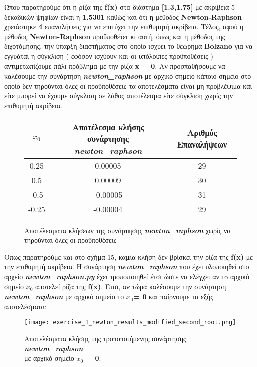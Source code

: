 \documentclass[First Project.tex]{subfiles}
\begin{document}
Ώπου παρατηρούμε ότι η ρίζα της \textlatin{\textbf{f(x)}} στο διάστημα \textlatin{\textbf{[1.3,1.75]}} με ακρίβεια 5 δεκαδικών ψηφίων 
είναι η \textbf{1.5301} καθώς και ότι η μέθοδος \textlatin{\textbf{Newton-Raphson}} χρειάστηκε \textbf{4} επαναλήψεις για να επιτύχει την 
επιθυμητή ακρίβεια. Τέλος, αφού η μέθοδος \textlatin{\textbf{Newton-Raphson}} προϋποθέτει κι αυτή, όπως και η μέθοδος της διχοτόμησης, την 
ύπαρξη διαστήματος στο οποίο ισχύει το θεώρημα \textlatin{\textbf{Bolzano}} για να εγγυάται η σύγκλιση ( εφόσον ισχύουν και οι υπόλοιπες 
προϋποθέσεις ) αντιμετωπίζουμε πάλι πρόβλημα με την ρίζα \textbf{\textlatin{x = 0}}. Αν προσπαθήσουμε να καλέσουμε την συνάρτηση
\textit{\textlatin{\textbf{newton\_raphson}}} με αρχικό σημείο κάποιο σημείο στο οποίο δεν τηρούνται όλες οι προϋποθέσεις τα αποτελέσματα
είναι μη προβλέψιμα και είτε μπορεί να έχουμε σύγκλιση σε λάθος αποτέλεσμα είτε σύγκλιση χωρίς την επιθυμητή ακρίβεια.
\begin{figure}[h!]
    \centering
    \captionsetup{justification=centering}
    \begin{center}
        \begin{tabular}{ |c|c|c| }       
            \hline
            \textbf{\textlatin{$x_{0}$}} & Αποτέλεσμα κλήσης συνάρτησης \textit{\textlatin{\textbf{newton\_raphson}}} & Αριθμός Επαναλήψεων \\
            \hline
            0.25 & 0.00005 & 29 \\ \hline
            0.5 & 0.00009 & 30 \\ \hline
            -0.5 & -0.00005 & 31 \\ \hline
            -0.25 & -0.00004 & 29 \\ [1ex]
            \hline
        \end{tabular}
        \caption{ Αποτέλεσματα κλήσεων της συνάρτησης \textit{\textlatin{\textbf{newton\_raphson}}} χωρίς να τηρούνται όλες οι προϋποθέσεις}
    \end{center}
\end{figure}

Όπως παρατηρούμε και στο σχήμα 15, καμία κλήση δεν βρίσκει την ρίζα της \textlatin{\textbf{f(x)}} με την επιθυμητή ακρίβεια. Η συνάρτηση 
\textit{\textlatin{\textbf{newton\_raphson}}} που έχει υλοποιηθεί στο αρχείο \textit{\textlatin{\textbf{newton\_raphson.py}}} έχει τροποποιηθεί 
έτσι ώστε να ελέγχει αν τo αρχικό σημείο \textbf{\textlatin{$x_{0}$}} αποτελεί ρίζα της \textlatin{\textbf{f(x)}}. Έτσι, αν τώρα
καλέσουμε την συνάρτηση \textit{\textlatin{\textbf{newton\_raphson}}} με αρχικό σημείο το \textlatin{\textbf{$x_{0}$= 0}} και παίρνουμε τα 
εξής αποτελέσματα:
\vspace{5mm}
\begin{figure}[h!]
    \centering
    \captionsetup{justification=centering}
    \begin{center}
    \texttt{[image: exercise\_1\_newton\_results\_modified\_second\_root.png]}    
    \caption{ Αποτελέσματα κλήσης της τροποποιήμενης συνάρτησης \textit{\textlatin{\textbf{newton\_raphson}}} \\ με αρχικό σημείο \textbf{\textlatin{$x_{0}$ = 0}}. }
    \end{center}
\end{figure}


\newpage

    
\end{document}
